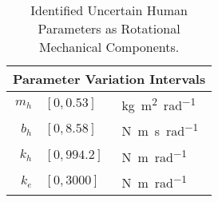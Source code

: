 \begin{table}%
\centering
\begin{tabular}{r l l}\toprule
\multicolumn{3}{c}{Parameter Variation Intervals}\\\midrule
$m_h$ & $[0,0.53]$ &\si{\kilo\gram\meter\squared\per\radian}\\
$b_h$ & $[0,8.58]$ &\si{\newton\meter\second\per\radian}\\
$k_h$ & $[0,994.2]$ &\si{\newton\meter\per\radian}\\
$k_e$ & $[0,3000]$ &\si{\newton\meter\per\radian}\\
\bottomrule
\end{tabular}
\caption[Identified Uncertain Human Parameters as Rotational Mechanical Components]{%
    Identified Uncertain Human Parameters as Rotational Mechanical Components.%
    }
\label{tab:app:humparam}
\end{table}

